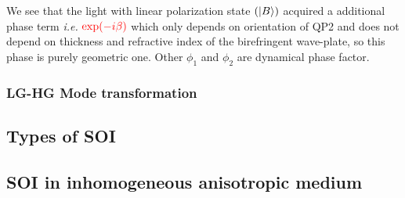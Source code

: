 \documentclass[11pt,a4paper]{article}
\numberwithin{equation}{section}
\begin{document}
We see that the light with linear polarization state $(\ket{B})$ acquired a additional phase term \textit{i.e.} ${\color{red}\exp(-i\beta)}$ which only depends on orientation of QP2 and does not depend on thickness and refractive index of the birefringent wave-plate, so this phase is purely geometric one. Other $\phi_1$ and $\phi_2$ are dynamical phase factor. \cite{WO}




\subsubsection{LG-HG Mode transformation}



\subsection{Types of SOI}

\subsection{SOI in inhomogeneous anisotropic medium}


\clearpage
\let\oldbibliography\thebibliography
\renewcommand{\thebibliography}[1]{%
	\oldbibliography{#1}%
	\setlength{\itemsep}{0pt}%
}

\small
{}\selectfont
\end{document}
